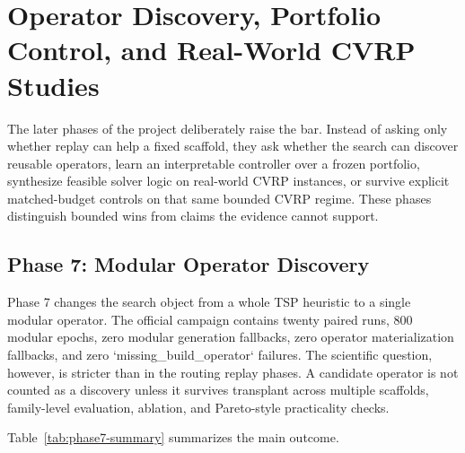 \chapter{Operator Discovery, Portfolio Control, and Real-World CVRP Studies}
\label{chap:advanced-phases}

The later phases of the project deliberately raise the bar. Instead of asking only whether replay
can help a fixed scaffold, they ask whether the search can discover reusable operators, learn an
interpretable controller over a frozen portfolio, synthesize feasible solver logic on real-world
CVRP instances, or survive explicit matched-budget controls on that same bounded CVRP regime. These
phases distinguish bounded wins from claims the evidence cannot support.

\section{Phase 7: Modular Operator Discovery}
\label{sec:advanced-phase7}

Phase 7 changes the search object from a whole TSP heuristic to a single modular operator. The
official campaign contains twenty paired runs, 800 modular epochs, zero modular generation
fallbacks, zero operator materialization fallbacks, and zero `missing\_build\_operator` failures.
The scientific question, however, is stricter than in the routing replay
phases. A candidate operator is not counted as a discovery unless it survives transplant across
multiple scaffolds, family-level evaluation, ablation, and Pareto-style practicality checks.

Table~\ref{tab:phase7-summary} summarizes the main outcome.

